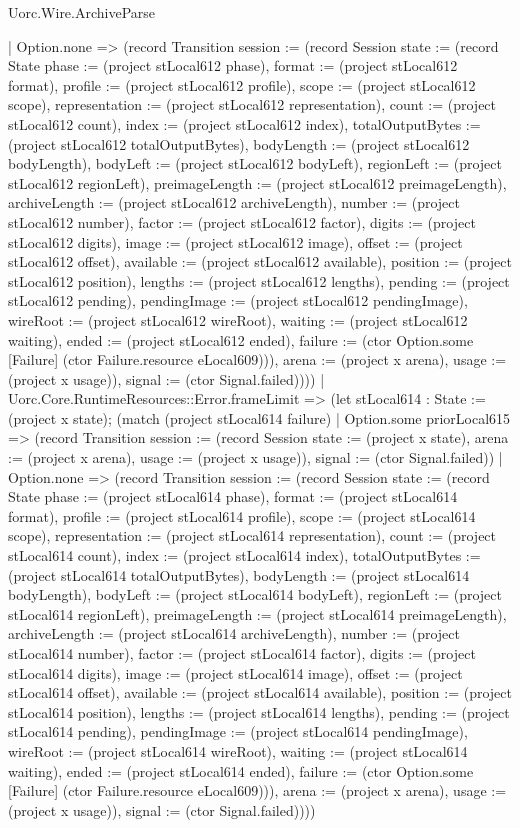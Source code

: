 \begin{lexlean}{Uorc.Wire.ArchiveParse}
\begin{semanticmodule}
{        | Option.none => (record Transition {session := (record Session {state := (record State {phase := (project stLocal612 phase), format := (project stLocal612 format), profile := (project stLocal612 profile), scope := (project stLocal612 scope), representation := (project stLocal612 representation), count := (project stLocal612 count), index := (project stLocal612 index), totalOutputBytes := (project stLocal612 totalOutputBytes), bodyLength := (project stLocal612 bodyLength), bodyLeft := (project stLocal612 bodyLeft), regionLeft := (project stLocal612 regionLeft), preimageLength := (project stLocal612 preimageLength), archiveLength := (project stLocal612 archiveLength), number := (project stLocal612 number), factor := (project stLocal612 factor), digits := (project stLocal612 digits), image := (project stLocal612 image), offset := (project stLocal612 offset), available := (project stLocal612 available), position := (project stLocal612 position), lengths := (project stLocal612 lengths), pending := (project stLocal612 pending), pendingImage := (project stLocal612 pendingImage), wireRoot := (project stLocal612 wireRoot), waiting := (project stLocal612 waiting), ended := (project stLocal612 ended), failure := (ctor Option.some [Failure] (ctor Failure.resource eLocal609))}), arena := (project x arena), usage := (project x usage)}), signal := (ctor Signal.failed)})))
      | Uorc.Core.RuntimeResources::Error.frameLimit => (let stLocal614 : State := (project x state); (match (project stLocal614 failure)
        | Option.some priorLocal615 => (record Transition {session := (record Session {state := (project x state), arena := (project x arena), usage := (project x usage)}), signal := (ctor Signal.failed)})
        | Option.none => (record Transition {session := (record Session {state := (record State {phase := (project stLocal614 phase), format := (project stLocal614 format), profile := (project stLocal614 profile), scope := (project stLocal614 scope), representation := (project stLocal614 representation), count := (project stLocal614 count), index := (project stLocal614 index), totalOutputBytes := (project stLocal614 totalOutputBytes), bodyLength := (project stLocal614 bodyLength), bodyLeft := (project stLocal614 bodyLeft), regionLeft := (project stLocal614 regionLeft), preimageLength := (project stLocal614 preimageLength), archiveLength := (project stLocal614 archiveLength), number := (project stLocal614 number), factor := (project stLocal614 factor), digits := (project stLocal614 digits), image := (project stLocal614 image), offset := (project stLocal614 offset), available := (project stLocal614 available), position := (project stLocal614 position), lengths := (project stLocal614 lengths), pending := (project stLocal614 pending), pendingImage := (project stLocal614 pendingImage), wireRoot := (project stLocal614 wireRoot), waiting := (project stLocal614 waiting), ended := (project stLocal614 ended), failure := (ctor Option.some [Failure] (ctor Failure.resource eLocal609))}), arena := (project x arena), usage := (project x usage)}), signal := (ctor Signal.failed)})))
}
\end{semanticmodule}
\end{lexlean}
